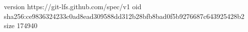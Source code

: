 version https://git-lfs.github.com/spec/v1
oid sha256:ce9836324233c0ad8ead309588dd312b28bfb8bad0f5b9276687c643925428b2
size 174940
